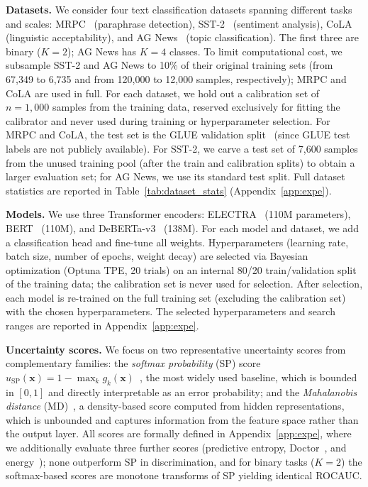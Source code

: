 \documentclass{article}
\theoremstyle{plain}
\theoremstyle{definition}
\theoremstyle{remark}
\begin{document}
\textbf{Datasets.}
We consider four text classification datasets spanning different tasks and scales: MRPC~\citep{dolan2005automatically} (paraphrase detection), SST-2~\citep{socher-etal-2013-recursive} (sentiment analysis), CoLA~\citep{warstadt2019neural} (linguistic acceptability), and AG News~\citep{zhang2015character} (topic classification).
The first three are binary ($K=2$); AG News has $K=4$ classes.
To limit computational cost, we subsample SST-2 and AG News to 10\% of their original training sets (from 67{,}349 to 6{,}735 and from 120{,}000 to 12{,}000 samples, respectively); MRPC and CoLA are used in full.
For each dataset, we hold out a calibration set of $n=1{,}000$ samples from the training data, reserved exclusively for fitting the calibrator and never used during training or hyperparameter selection.
For MRPC and CoLA, the test set is the GLUE validation split~\citep{wang-etal-2018-glue} (since GLUE test labels are not publicly available).
For SST-2, we carve a test set of 7{,}600 samples from the unused training pool (after the train and calibration splits) to obtain a larger evaluation set; for AG News, we use its standard test split.
Full dataset statistics are reported in Table~\ref{tab:dataset_stats} (Appendix~\ref{app:expe}).

\textbf{Models.}
We use three Transformer encoders: ELECTRA~\citep{clark2020electrapretrainingtextencoders} (110M parameters), BERT~\citep{devlin2019bert} (110M), and DeBERTa-v3~\citep{he2021debertadecodingenhancedbertdisentangled} (138M).
For each model and dataset, we add a classification head and fine-tune all weights.
Hyperparameters (learning rate, batch size, number of epochs, weight decay) are selected via Bayesian optimization (Optuna TPE, 20 trials) on an internal 80/20 train/validation split of the training data; the calibration set is never used for selection.
After selection, each model is re-trained on the full training set (excluding the calibration set) with the chosen hyperparameters.
The selected hyperparameters and search ranges are reported in Appendix~\ref{app:expe}.

\textbf{Uncertainty scores.}
We focus on two representative uncertainty scores from complementary families:
the \emph{softmax probability} (SP) score $u_{\mathrm{SP}}(\mathbf{x}) = 1 - \max_k g_k(\mathbf{x})$~\citep{hendrycks2018baselinedetectingmisclassifiedoutofdistribution}, the most widely used baseline, which is bounded in $[0,1]$ and directly interpretable as an error probability;
and the \emph{Mahalanobis distance} (MD)~\citep{vazhentsev_uncertainty_2022}, a density-based score computed from hidden representations, which is unbounded and captures information from the feature space rather than the output layer.
All scores are formally defined in Appendix~\ref{app:expe}, where we additionally evaluate three further scores (predictive entropy, Doctor~\citep{granese2021doctorsimplemethoddetecting}, and energy~\citep{liu2021energybasedoutofdistributiondetection}); none outperform SP in discrimination, and for binary tasks ($K=2$) the softmax-based scores are monotone transforms of SP yielding identical ROCAUC.
\end{document}
